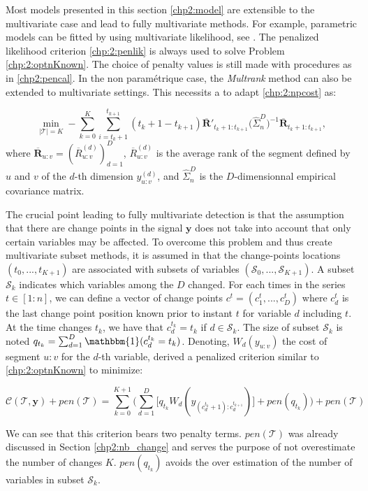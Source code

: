 Most models presented in this section \ref{chp2:model} are extensible to the multivariate case and lead to fully multivariate methods. For example, parametric models can be fitted by using multivariate likelihood, see . The penalized likelihood criterion \ref{chp:2:penlik} is always used to solve Problem \ref{chp:2:optnKnown}. The choice of penalty values is still made with procedures as in \ref{chp2:pencal}. In the non paramétrique case, the \textit{Multrank} method can also be extended to multivariate settings. This necessits a to adapt \ref{chp:2:npcost} as:  

\begin{equation}\label{chp:2:npcostmulti}
\min_{\lvert\mathcal{T}\rvert = K}  -\sum_{k=0}^K \sum_{i = t_k+1}^{t_{k+1}} (t_k+1-t_{k+1})\overline{\bm R}'_{t_k+1:t_{k+1}}\bigg(\hat{\Sigma}_n^D\bigg)^{-1}\overline{\bm R}_{t_k+1:t_{k+1}},
\end{equation}       
where $\overline{\bm R}_{u:v} = (\overline{R}^{(d)}_{u:v})_{d=1}^D$, $\overline{R}^{(d)}_{u:v}$ is the average rank of the segment defined by $u$ and $v$ of the $d$-th dimension $y^{(d)}_{u:v}$, and $\hat{\Sigma}_n^D$ is the $D$-dimensionnal empirical covariance matrix. 

The crucial point leading to fully multivariate detection is that the assumption that there are change points in the signal $\bm y$ does not take into account that only certain variables may be affected. To overcome this problem and thus create multivariate subset methods, it is assumed in \cite{pickering2016changepoint} that the change-points locations $(t_0,...,t_{K+1})$ are associated with subsets of variables $(\mathcal{S}_0,...,\mathcal{S}_{K+1})$. A subset $\mathcal{S}_k$ indicates which variables among the $D$ changed. For each times in the series $t \in [1:n]$, we can define a vector of change points $c^t = (c_1^t,...,c_D^t)$ where $c_d^t$ is the last change point position known prior to instant $t$ for variable $d$ including $t$. At the time changes $t_k$, we have that $c_d^{t_k} = t_k$ if $d \in \mathcal{S}_k$. The size of subset $\mathcal{S}_k$ is noted $q_{t_k} = \sum_{d=1}^D\mathbbm{1}(c_d^{t_k} = t_k)$. Denoting, $W_d(y_{u:v})$ the cost of segment $u:v$ for the $d$-th variable, \cite{pickering2016changepoint} derived a penalized criterion similar to \ref{chp:2:optnKnown} to minimize: 

\begin{equation}\label{chp:2:optnKnownmulti}
\mathcal{C}(\mathcal{T},\bm y) + pen(\mathcal{T}) = \sum_{k = 0}^{K+1}\bigg(\sum_{d=1}^D \bigg[ q_{t_k}W_d(y_{(c^{t_k}_d+1):c^{t_{k+1}}_d})\bigg] + pen(q_{t_k}) \bigg) + pen(\mathcal{T})
\end{equation}      

We can see that this criterion bears two penalty terms. $pen(\mathcal{T})$ was already discussed in Section \ref{chp2:nb_change} and serves the purpose of not overestimate the number of changes $K$. $pen(q_{t_k})$ avoids the over estimation of the number of variables in subset $\mathcal{S}_k$. 




